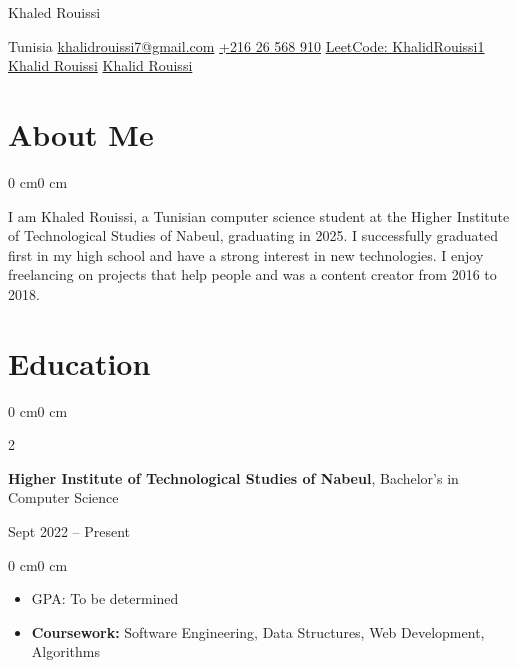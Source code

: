 \documentclass[10pt, letterpaper]{article}
\newenvironment{highlights}{
    \begin{itemize}[
        topsep=0.10 cm,
        parsep=0.10 cm,
        partopsep=0pt,
        itemsep=0pt,
        leftmargin=0 cm + 10pt
    ]
}{
    \end{itemize}
}
\newenvironment{onecolentry}{
    \begin{adjustwidth}{0 cm}{0 cm}
}{
    \end{adjustwidth}
}
\newenvironment{twocolentry}[2][]{
    \onecolentry
    \def\secondColumn{#2}
    \setcolumnwidth{\fill, 4.5 cm}
    \begin{paracol}{2}
}{
    \switchcolumn \raggedleft \secondColumn
    \end{paracol}
    \endonecolentry
}
\newenvironment{header}{
    \setlength{\topsep}{0pt}\par\kern\topsep\centering\linespread{1.5}
}{
    \par\kern\topsep
}
\begin{document}
\begin{header}
    \fontsize{25 pt}{25 pt}\selectfont Khaled Rouissi

    \vspace{5 pt}

    \normalsize
    Tunisia\AND\hspace{1cm}
    \href{mailto:khalidrouissi1@gmail.com}{khalidrouissi7@gmail.com}\AND\hspace{1cm}
    \href{tel:+216-26-568-910}{+216 26 568 910}\AND\hspace{1cm}
\href{https://leetcode.com/u/KhalidRouissi1/}{    LeetCode:  KhalidRouissi1} \hspace{1cm}\hspace{1cm}\hspace{1cm}
    \href{https://linkedin.com/in/khalid-rouissi-6a136b242}{\faLinkedin Khalid Rouissi} \hspace{1cm}
    \href{https://github.com/KhalidRouissi1}{\faGithub Khalid Rouissi}
\end{header}
\vspace{0.5 cm}

\section{About Me}
\begin{onecolentry}
    I am Khaled Rouissi, a Tunisian computer science student at the Higher Institute of Technological Studies of Nabeul, graduating in 2025. I successfully graduated first in my high school and have a strong interest in new technologies. I enjoy freelancing on projects that help people and was a content creator from 2016 to 2018.
\end{onecolentry}

\vspace{0.5 cm}

\section{Education}
\begin{twocolentry}{Sept 2022 – Present}
    \textbf{Higher Institute of Technological Studies of Nabeul}, Bachelor's in Computer Science
\end{twocolentry}

\vspace{0.10 cm}
\begin{onecolentry}
    \begin{highlights}
        \item GPA: To be determined
        \item \textbf{Coursework:} Software Engineering, Data Structures, Web Development, Algorithms
    \end{highlights}
\end{onecolentry}
\end{document}
